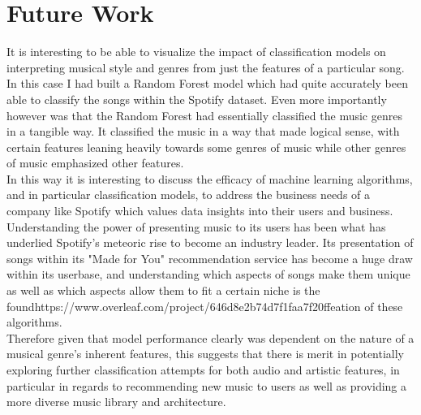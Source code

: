 \documentclass[12pt]{article}
\begin{document}
\section{Future Work}
It is interesting to be able to visualize the impact of classification models on interpreting musical style and genres from just the features of a particular song. In this case I had built a Random Forest model which had quite accurately been able to classify the songs within the Spotify dataset. Even more importantly however was that the Random Forest had essentially classified the music genres in a tangible way. It classified the music in a way that made logical sense, with certain features leaning heavily towards some genres of music while other genres of music emphasized other features. \\

\noindent
In this way it is interesting to discuss the efficacy of machine learning algorithms, and in particular classification models, to address the business needs of a company like Spotify which values data insights into their users and business. Understanding the power of presenting music to its users has been what has underlied Spotify's meteoric rise to become an industry leader. Its presentation of songs within its "Made for You" recommendation service has become a huge draw within its userbase, and understanding which aspects of songs make them unique as well as which aspects allow them to fit a certain niche is the foundhttps://www.overleaf.com/project/646d8e2b74d7f1faa7f20ffeation of these algorithms. \\

\noindent
Therefore given that model performance clearly was dependent on the nature of a musical genre's inherent features, this suggests that there is merit in potentially exploring further classification attempts for both audio and artistic features, in particular in regards to recommending new music to users as well as providing a more diverse music library and architecture.
\end{document}
